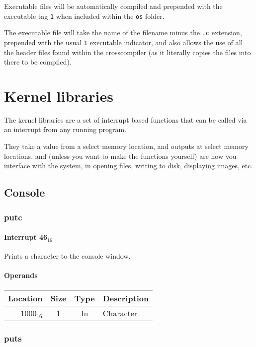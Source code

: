 \documentclass{article}
\begin{document}
Executable files will be automatically compiled and prepended with the
executable tag \verb|1| when included within the \verb|os| folder.

The executable file will take the name of the filename minus the \verb|.c|
extension, prepended with the usual \verb|1| executable indicator, and
also allows the use of all the header files found within the crosscompiler
(as it literally copies the files into there to be compiled).

\section{Kernel libraries}

The kernel libraries are a set of interrupt based functions that can be called
via an interrupt from any running program.

They take a value from a select memory location, and outputs at select memory
locations, and (unless you want to make the functions yourself) are how you
interface with the system, in opening files, writing to disk, displaying images,
etc.

\newpage

\subsection{Console}

\subsubsection{putc}

\paragraph{Interrupt 46$_{16}$}

Prints a character to the console window.

\paragraph{Operands}

\begin{tabular}{|r|c|c|l|}
	\hline
	\textbf{Location} & \textbf{Size} & \textbf{Type} & \textbf{Description} \\
	\hline
	1000$_{16}$ & 1 & In & Character \\
	\hline
\end{tabular}

\subsubsection{puts}
\end{document}
